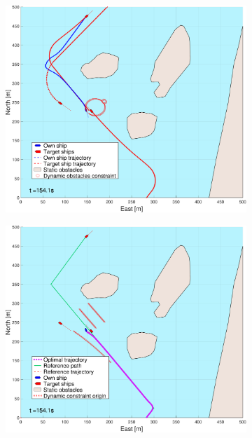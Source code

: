 \begin{figure}[ht]\ContinuedFloat
    \begin{subfigure}[b]{0.494\textwidth}
        \centering
        \includegraphics[width=\textwidth]{Images/NewFigures/Helloya_Rev/_Simple_0fig1_time=155}
        \subcaption{}
    \end{subfigure}
    \hfill
    \begin{subfigure}[b]{0.494\textwidth}
        \centering
        \includegraphics[width=\textwidth]{Images/NewFigures/Helloya_Rev/_Simple_0fig999_time=155}

\end{subfigure}
\end{figure}

